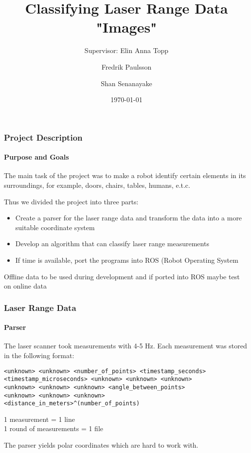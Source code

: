 \documentclass{beamer}
\title[Classifying Laser Range Data "Images"] %
{Classifying Laser Range Data "Images"}
\subtitle{Supervisor: Elin Anna Topp}
\author[F. Paulsson, S. Senanayake]%
{Fredrik Paulsson \and Shan Senanayake}
\institute[LTH] %
{Lund University \\ Faculty of Engineering}
\date[\today] %
{\today}
\begin{document}
\frame{\titlepage}

\begin{frame}
\frametitle{Project Description}
\framesubtitle{Purpose and Goals}

The main task of the project was to make a robot identify certain elements in its surroundings, for example, doors, chairs, tables, humans, e.t.c.

\vspace{10pt}

Thus we divided the project into three parts:

\begin{itemize}
\pause
\item{Create a parser for the laser range data and transform the data into a more suitable coordinate system}
\pause  
\item{Develop an algorithm that can classify laser range measurements}
\pause  
\item{If time is available, port the programs into ROS (Robot Operating System}
\end{itemize}
\pause
Offline data to be used during development and if ported into ROS maybe test on online data

\end{frame}

\begin{frame}[fragile]
\frametitle{Laser Range Data}
\framesubtitle{Parser}

The laser scanner took measurements with 4-5 Hz. Each measurement was stored in the following format:
\begin{verbatim}
<unknown> <unknown> <number_of_points> <timestamp_seconds>
<timestamp_microseconds> <unknown> <unknown> <unknown>
<unknown> <unknown> <unknown> <angle_between_points>
<unknown> <unknown> <unknown>
<distance_in_meters>^(number_of_points)
\end{verbatim}

1 measurement = 1 line
\\
1 round of measurements = 1 file

\pause
\vspace{10pt}

The parser yields polar coordinates which are hard to work with.

\end{frame}
\end{document}
